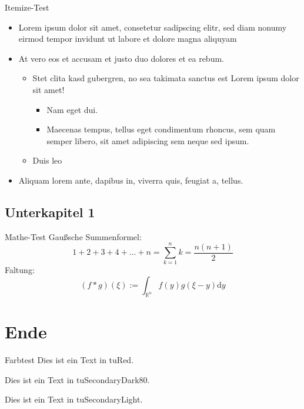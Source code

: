 \documentclass[fleqn,11pt,aspectratio=43]{beamer}
\begin{document}
\begin{frame}{Itemize-Test}
  \begin{itemize}
    \item Lorem ipsum dolor sit amet, consetetur sadipscing elitr, sed diam
      nonumy eirmod tempor invidunt ut labore et dolore magna aliquyam
    \item At vero eos et accusam et justo duo dolores et ea rebum.
      \begin{itemize}
        \item Stet clita kasd gubergren, no sea takimata sanctus est Lorem ipsum
          dolor sit amet!
          \begin{itemize}
            \item Nam eget dui.
            \item Maecenas tempus, tellus eget condimentum rhoncus, sem quam
              semper libero, sit amet adipiscing sem neque sed ipsum.
          \end{itemize}
        \item Duis leo
      \end{itemize}
    \item Aliquam lorem ante, dapibus in, viverra quis, feugiat a, tellus. 
  \end{itemize}
\end{frame}


\subsection{Unterkapitel 1}


\begin{frame}{Mathe-Test}
  Gaußsche Summenformel:
  \[1 + 2 + 3 + 4 + \ldots + n = \sum_{k=1}^n k = \frac{n(n+1)}{2}\]
  Faltung:
  \[(f*g)(\xi) := \int_{\mathbb{R}^n} f(y)g(\xi-y)\mathrm{d}y\]
\end{frame}



\section{Ende}


\begin{frame}{Farbtest}
  \color{tuRed}
  Dies ist ein Text in tuRed.

  \color{tuSecondaryDark80}
  Dies ist ein Text in tuSecondaryDark80.

  \color{tuSecondaryLight}
  Dies ist ein Text in tuSecondaryLight.
\end{frame}
\end{document}
